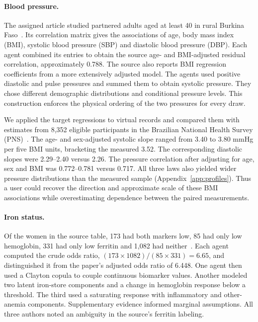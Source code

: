 \documentclass[sigconf,anonymous,review]{acmart}
\begin{document}
\paragraph{Blood pressure.}
The assigned article studied partnered adults aged at least 40 in rural Burkina Faso~\cite{jaspert}. Its correlation matrix gives the associations of age, body mass index (BMI), systolic blood pressure (SBP) and diastolic blood pressure (DBP). Each agent combined its entries to obtain the source age- and BMI-adjusted residual correlation, approximately 0.788. The source also reports BMI regression coefficients from a more extensively adjusted model. The agents used positive diastolic and pulse pressures and summed them to obtain systolic pressure. They chose different demographic distributions and conditional pressure levels. This construction enforces the physical ordering of the two pressures for every draw.

We applied the target regressions to virtual records and compared them with estimates from 8,352 eligible participants in the Brazilian National Health Survey (PNS)~\cite{pns}. The age- and sex-adjusted systolic slope ranged from 3.40 to 3.80 mmHg per five BMI units, bracketing the measured 3.52. The corresponding diastolic slopes were 2.29--2.40 versus 2.26. The pressure correlation after adjusting for age, sex and BMI was 0.772--0.781 versus 0.717. All three laws also yielded wider pressure distributions than the measured sample (Appendix~\ref{app:profiles}). Thus a user could recover the direction and approximate scale of these BMI associations while overestimating dependence between the paired measurements.

\paragraph{Iron status.}
Of the women in the source table, 173 had both markers low, 85 had only low hemoglobin, 331 had only low ferritin and 1,082 had neither~\cite{zhu}. Each agent computed the crude odds ratio, $(173\times1082)/(85\times331)=6.65$, and distinguished it from the paper's adjusted odds ratio of 6.448. One agent then used a Clayton copula to couple continuous biomarker values. Another modeled two latent iron-store components and a change in hemoglobin response below a threshold. The third used a saturating response with inflammatory and other-anemia components. Supplementary evidence informed marginal assumptions. All three authors noted an ambiguity in the source's ferritin labeling.
\end{document}

